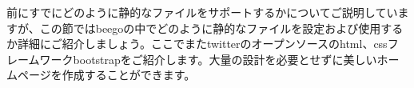 前にすでにどのように静的なファイルをサポートするかについてご説明していますが、この節ではbeegoの中でどのように静的なファイルを設定および使用するか詳細にご紹介しましょう。ここでまたtwitterのオープンソースのhtml、cssフレームワークbootstrapをご紹介します。大量の設計を必要とせずに美しいホームページを作成することができます。
